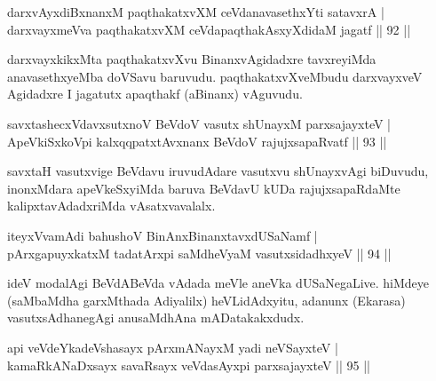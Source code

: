 

\begin{shl}
darxvAyxdiBxnanxM paqthakatxvXM ceVdanavasethxYti satavxrA  | \\
darxvayxmeVva paqthakatxvXM ceVdapaqthakAsxyXdidaM jagatf \hfill||  92 || 
\end{shl}

\begin{artha}
darxvayxkikxMta paqthakatxvXvu BinanxvAgidadxre tavxreyiMda anavasethxyeMba doVSavu  baruvudu. paqthakatxvXveMbudu darxvayxveV Agidadxre I jagatutx apaqthakf (aBinanx) vAguvudu.
\end{artha}


\begin{shl}
savxtashecxVdavxsutxnoV BeVdoV vasutx shUnayxM parxsajayxteV  | \\
ApeVkiSxkoV\s pi kalxqqpatxtAvxnanx BeVdoV rajujxsapaRvatf \hfill||  93 ||  
\end{shl}

\begin{artha}
savxtaH vasutxvige BeVdavu iruvudAdare vasutxvu shUnayxvAgi biDuvudu,  inonxMdara apeVkeSxyiMda baruva BeVdavU kUDa rajujxsapaRdaMte kalipxtavAdadxriMda vAsatxvavalalx.
\end{artha}

\begin{shl}
iteyxVvamAdi bahushoV BinAnxBinanxtavxdUSaNamf  | \\
pArxgapuyxkatxM tadatArxpi saMdheVyaM vasutxsidadhxyeV \hfill||  94 ||  
\end{shl}

\begin{artha}
ideV modalAgi BeVdABeVda vAdada meVle aneVka dUSaNegaLive. hiMdeye (saMbaMdha garxMthada Adiyalilx) heVLidAdxyitu, adanunx (Ekarasa) vasutxsAdhanegAgi anusaMdhAna mADatakakxdudx.
\end{artha}

\begin{shl}
api veVdeYkadeVshasayx pArxmANayxM yadi neVSayxteV  | \\
kamaRkANaDxsayx savaRsayx veVdasAyxpi parxsajayxteV \hfill||  95 ||  
\end{shl}

